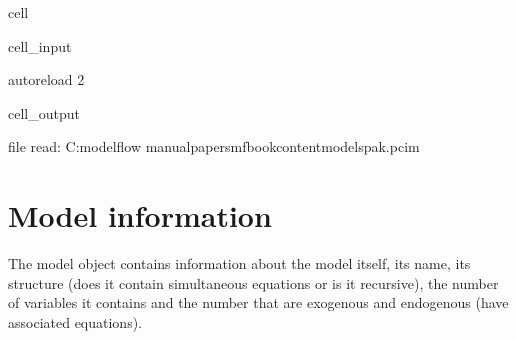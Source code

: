 \documentclass[letterpaper,10pt,english]{jupyterBook}
\begin{document}
\begin{sphinxuseclass}{cell}\begin{sphinxVerbatimInput}

\begin{sphinxuseclass}{cell_input}
\begin{sphinxVerbatim}[commandchars=\\\{\}]
   
 autoreload
 2

  

\end{sphinxVerbatim}

\end{sphinxuseclass}\end{sphinxVerbatimInput}
\begin{sphinxVerbatimOutput}

\begin{sphinxuseclass}{cell_output}
\begin{sphinxVerbatim}[commandchars=\\\{\}]
file read:  C:\PYGZbs{}modelflow manual\PYGZbs{}papers\PYGZbs{}mfbook\PYGZbs{}content\PYGZbs{}models\PYGZbs{}pak.pcim
\end{sphinxVerbatim}

\end{sphinxuseclass}\end{sphinxVerbatimOutput}

\end{sphinxuseclass}

\section{Model information}
\label{\detokenize{content/06_ModelAnalytics/ModelStructure:model-information}}
\sphinxAtStartPar
The model object contains information about the model itself, its name, its structure (does it contain simultaneous equations or is it recursive), the number of variables it contains and the number that are exogenous and endogenous (have associated equations).
\end{document}
